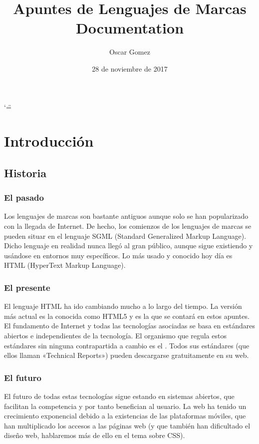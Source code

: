 \documentclass[letterpaper,10pt,spanish]{sphinxmanual}
\title{Apuntes de Lenguajes de Marcas Documentation}
\date{28 de noviembre de 2017}
\author{Oscar Gomez}
\begin{document}
\ifnum\catcode`\"=\active{}\fi
\maketitle
\sphinxtableofcontents
{}\label{\detokenize{index::doc}}



\chapter{Introducción}
\label{\detokenize{tema1:apuntes-de-lenguajes-de-marcas}}\label{\detokenize{tema1::doc}}\label{\detokenize{tema1:introduccion}}

\section{Historia}
\label{\detokenize{tema1:historia}}

\subsection{El pasado}
\label{\detokenize{tema1:el-pasado}}
Los lenguajes de marcas son bastante antiguos aunque solo se han popularizado con la llegada de Internet.  De hecho, los comienzos de los lenguajes de marcas se pueden situar en el lenguaje SGML (Standard Generalized Markup Language). Dicho lenguaje en realidad nunca llegó al gran público, aunque sigue existiendo y usándose en entornos muy específicos. Lo más usado y conocido hoy día es HTML (HyperText Markup Language).


\subsection{El presente}
\label{\detokenize{tema1:el-presente}}
El lenguaje HTML ha ido cambiando mucho a lo largo del tiempo. La versión más actual es la conocida como HTML5 y es la que se contará en estos apuntes.
El fundamento de Internet y todas las tecnologías asociadas se basa en estándares abiertos e
independientes de la tecnología. El organismo que regula estos estándares sin ninguna contrapartida a cambio es el  . Todos sus estándares (que ellos llaman «Technical Reports») pueden descargarse gratuitamente en su web.


\subsection{El futuro}
\label{\detokenize{tema1:el-futuro}}
El futuro de todas estas tecnologías sigue estando en sistemas abiertos, que facilitan la competencia y por tanto benefician al usuario. La web ha tenido un crecimiento exponencial debido a la existencias de las plataformas móviles, que han multiplicado los accesos a las páginas web (y que también han dificultado el diseño web, hablaremos más de ello en el tema sobre CSS).
\end{document}
